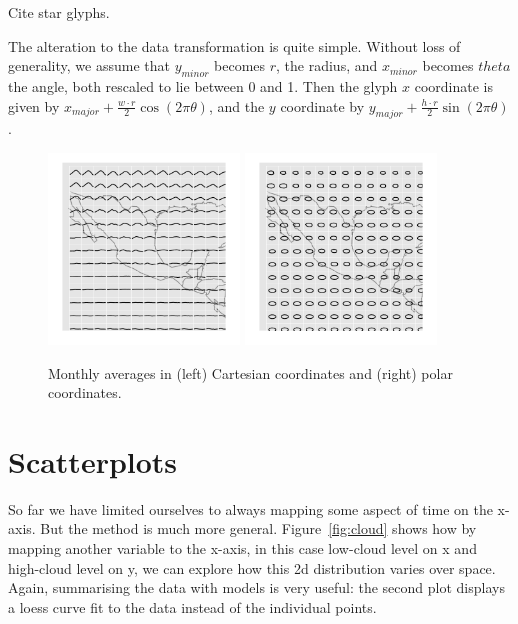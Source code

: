 \documentclass[oneside]{article}
\begin{document}
Cite star glyphs.

The alteration to the data transformation is quite simple. Without loss of generality, we assume that $y_{minor}$ becomes $r$, the radius, and $x_{minor}$ becomes $theta$ the angle, both rescaled to lie between 0 and 1. Then the glyph $x$ coordinate is given by $x_{major} + \frac{w \cdot r}{2} \cos(2 \pi \theta)$, and the $y$ coordinate by $y_{major} + \frac{h \cdot r}{2} \sin(2 \pi \theta)$.

\begin{figure}[htbp]
  \centering
  \includegraphics[width=2in]{month-cartesian}
  \includegraphics[width=2in]{month-polar}
    
  \caption{Monthly averages in (left) Cartesian coordinates and (right) polar coordinates.}
  
  \label{fig:cycle}
\end{figure}

\section{Scatterplots}

So far we have limited ourselves to always mapping some aspect of time on the x-axis. But the method is much more general. Figure~\ref{fig:cloud} shows how by mapping another variable to the x-axis, in this case low-cloud level on x and high-cloud level on y, we can explore how this 2d distribution varies over space. Again, summarising the data with models is very useful: the second plot displays a loess curve fit to the data instead of the individual points.  
\end{document}
